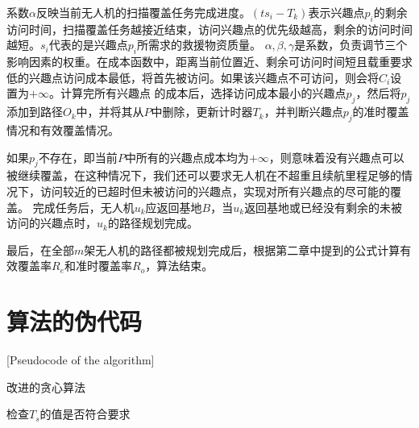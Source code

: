 系数$\alpha$反映当前无人机的扫描覆盖任务完成进度。$(ts_i - T_k)$表示兴趣点$p_i$的剩余访问时间，扫描覆盖任务越接近结束，访问兴趣点的优先级越高，剩余的访问时间越短。$s_i$代表的是兴趣点$p_i$所需求的救援物资质量。
$\alpha,\beta,\gamma$是系数，负责调节三个影响因素的权重。在成本函数中，距离当前位置近、剩余可访问时间短且载重要求低的兴趣点访问成本最低，将首先被访问。如果该兴趣点不可访问，则会将$C_i$设置为$+\infty$。计算完所有兴趣点
的成本后，选择访问成本最小的兴趣点$p_j$，然后将$p_j$添加到路径$O_k$中，并将其从$P$中删除，更新计时器$T_k$，并判断兴趣点$p_j$的准时覆盖情况和有效覆盖情况。


如果$p_j$不存在，即当前$P$中所有的兴趣点成本均为$+\infty$，则意味着没有兴趣点可以被继续覆盖，在这种情况下，我们还可以要求无人机在不超重且续航里程足够的情况下，访问较近的已超时但未被访问的兴趣点，实现对所有兴趣点的尽可能的覆盖。
完成任务后，无人机$u_k$应返回基地$B$，当$u_k$返回基地或已经没有剩余的未被访问的兴趣点时，$u_k$的路径规划完成。


最后，在全部$m$架无人机的路径都被规划完成后，根据第二章中提到的公式计算有效覆盖率$R_e$和准时覆盖率$R_o$，算法结束。

\section{算法的伪代码}[Pseudocode of the algorithm]
 
\begin{algorithm}[H]  %
	\caption{改进的贪心算法}%
	\LinesNumbered %
	检查$T_s$的值是否符合要求\; %
\end{algorithm}


